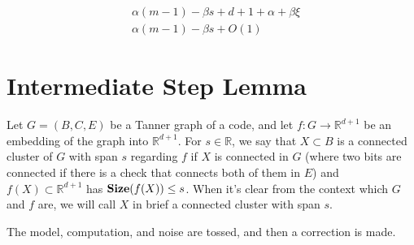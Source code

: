 \begin{equation*}
  \begin{split}
    & \alpha \left(m - 1\right) - \beta s + d+1+ \alpha + \beta \xi \\
    & \alpha \left(m - 1\right) - \beta s + O(1) 
  \end{split}
\end{equation*}

\section{Intermediate Step Lemma}


\begin{definition}
Let $G = (B,C,E)$ be a Tanner graph of a code, and let $f \colon G \rightarrow \mathbb{R}^{d+1}$ be an embedding of the graph into $\mathbb{R}^{d+1}$. For $s \in \mathbb{R}$, we say that $X \subset B$ is a connected cluster of $G$ with span $s$ regarding $f$ if $X$ is connected in $G$ (where two bits are connected if there is a check that connects both of them in $E$) and $f(X) \subset \mathbb{R}^{d+1}$ has $\mathbf{Size}(f(X)) \le s$. When it's clear from the context which $G$ and $f$ are, we will call $X$ in brief a connected cluster with span $s$.
\end{definition}

\begin{definition}
The model, computation, and noise are tossed, and then a correction is made.
\end{definition}

